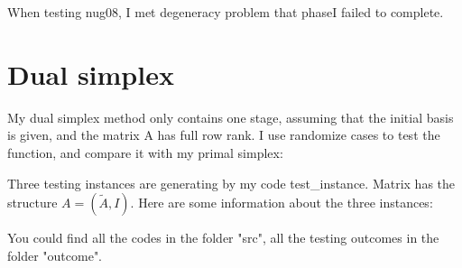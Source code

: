 \documentclass[11pt]{article}
\begin{document}
	When testing nug08, I met degeneracy problem that phaseI failed to complete.
\section{Dual simplex}

	My dual simplex method only contains one stage, assuming that the initial basis is given, and the matrix A has full row rank. I use randomize cases to test the function, and compare it with my primal simplex:
	\begin{center}
	\end{center}
	
	Three testing instances are generating by my code test\_instance. Matrix has the structure $A = (\tilde{A},I)$. Here are some information about the three instances:
	\begin{center}
	\end{center}

	You could find all the codes in the folder "src", all the testing outcomes in the folder "outcome".
\end{document}
